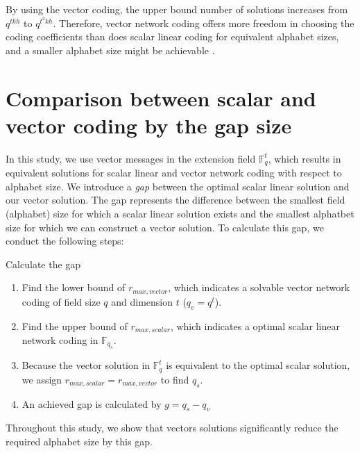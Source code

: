 \begin{claim}
By using the vector coding, the upper bound number of solutions increases
from $q^{tkh}$ to $q^{t^{2}kh}$. Therefore, vector network coding
offers more freedom in choosing the coding coefficients than does
scalar linear coding for equivalent alphabet sizes, and a smaller
alphabet size might be achievable \cite{Ebrahimi2011}.
\end{claim}

\section{Comparison between scalar and vector coding by the gap size}

In this study, we use vector messages in the extension field $\ensuremath{\mathbb{F}}_{q}^{t}$,
which results in equivalent solutions for scalar linear and vector
network coding with respect to alphabet size. We introduce a \textit{gap}
between the optimal scalar linear solution and our vector solution.
The gap represents the difference between the smallest field (alphabet)
size for which a scalar linear solution exists and the smallest alphatbet
size for which we can construct a vector solution. To calculate this
gap, we conduct the following steps:

\begin{algorithm}
\caption{Calculate the gap\label{alg:Calculate-the-gap}}

\begin{enumerate}
\item Find the lower bound of $r_{max,vector}$, which indicates a solvable
vector network coding of field size $q$ and dimension $t$ ($q_{v}=q^{t}$).
\item Find the upper bound of $r_{max,scalar}$, which indicates a optimal
scalar linear network coding in $\ensuremath{\mathbb{F}}_{q_{s}}$.
\item Because the vector solution in $\ensuremath{\mathbb{F}}_{q}^{t}$
is equivalent to the optimal scalar solution, we assign $r_{max,scalar}=r_{max,vector}$
to find $q_{s}$.
\item An achieved gap is calculated by $g=q_{s}-q_{v}$
\end{enumerate}
\end{algorithm}

Throughout this study, we show that vectors solutions significantly
reduce the required alphabet size by this gap. 

\clearpage
